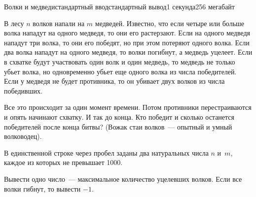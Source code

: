 \begin{problem}[(Антонов Ю.\,С.)]{Волки и медведи}{стандартный ввод}{стандартный вывод}{1 секунда}{256 мегабайт}

В лесу $n$ волков напали на $m$ медведей. Известно, что если четыре или больше волка нападут на одного медведя, то они его растерзают. Если на одного медведя нападут три волка, то они его победят, но при этом потеряют одного волка. Если два волка нападут на одного медведя, то волки погибнут, а медведь уцелеет. Если в схватке будут участвовать один волк и один медведь, то медведь не только убьет волка, но одновременно убьет еще одного волка из числа победителей. Если у медведя не будет противника, то он убивает двух волков из числа победивших. 

Все это происходит за один момент времени. Потом противники перестраиваются и опять начинают схватку. И так до конца. Кто победит и сколько останется победителей после конца битвы? (Вожак стаи волков~--- опытный и умный волководец).


\InputFile
В единственной строке через пробел заданы два натуральных числа $n$ и~$m$, каждое из которых не превышает 1000.

\OutputFile
Вывести одно число~--- максимальное количество уцелевших волков. Если все волки гибнут, то вывести $-1$.

\Examples

\begin{example}
%
%
\end{example}

\end{problem}

